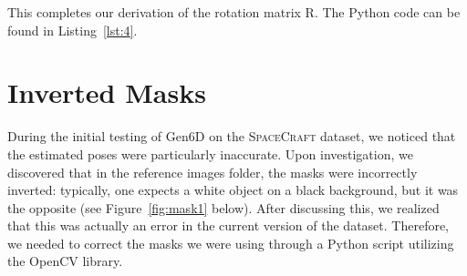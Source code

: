 \bigskip

\noindent This completes our derivation of the rotation matrix $\bm{\mathrm{R}}$. The Python code can be found in Listing~\ref{lst:4}.

\section{Inverted Masks}
During the initial testing of Gen6D on the \textsc{SpaceCraft} dataset, we noticed that the estimated poses were particularly inaccurate. Upon investigation, we discovered that in the reference images folder, the masks were incorrectly inverted: typically, one expects a white object on a black background, but it was the opposite (see Figure~\ref{fig:mask1} below).
After discussing this, we realized that this was actually an error in the current version of the dataset. Therefore, we needed to correct the masks we were using through a Python script utilizing the OpenCV library. 
